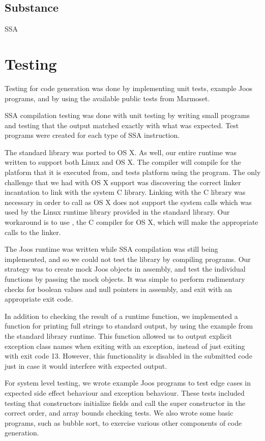 \documentclass[pdftex,11pt,a4paper]{article}
\begin{document}
\subsection{Substance}

SSA


\section{Testing}

Testing for code generation was done by implementing unit tests,
example Joos programs, and by using the available public tests from
Marmoset.

SSA compilation testing was done with unit testing by writing small
programs and testing that the output matched exactly with what was
expected. Test programs were created for each type of SSA
instruction.

The standard library  was ported to OS X. As well, our
entire runtime was written to support both  Linux and  OS
X. The compiler will compile for the platform that it is executed
from, and tests platform using the  program. The only
challenge that we had with OS X support was discovering the correct
linker incantation to link with the system C library. Linking with the
C library was necessary in order to call  as OS X does not
support the system calls which was used by the Linux runtime library
provided in the standard library. Our workaround is to use
, the C compiler for OS X, which will make the appropriate
calls to the linker.

The Joos runtime was written while SSA compilation was still being
implemented, and so we could not test the library by compiling
programs. Our strategy was to create mock Joos objects in assembly,
and test the individual functions by passing the mock objects. It was
simple to perform rudimentary checks for boolean values and null
pointers in assembly, and exit with an appropriate exit code.

In addition to checking the result of a runtime function, we
implemented a function for printing full strings to standard output,
by using the example from the standard library runtime. This function
allowed us to output explicit exception class names when exiting with
an exception, instead of just exiting with exit code 13. However, this
functionality is disabled in the submitted code just in case it would
interfere with expected output.

For system level testing, we wrote example Joos programs to test edge
cases in expected side effect behaviour and exception behaviour. These
tests included testing that constructors initialize fields and call the
super constructor in the correct order, and array bounds checking
tests. We also wrote some basic programs, such as bubble sort, to
exercise various other components of code generation.
\end{document}
